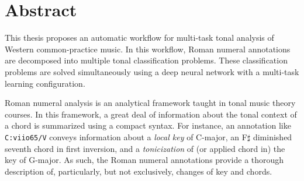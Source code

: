 \chapter*{Abstract}
\label{chap:chap0-abs}

This thesis proposes an automatic workflow for multi-task tonal analysis of Western common-practice music. 
In this workflow, Roman numeral annotations are decomposed into multiple tonal classification problems. 
These classification problems are solved simultaneously using a deep neural network with a multi-task learning configuration.

Roman numeral analysis is an analytical framework taught in tonal music theory courses.
In this framework, a great deal of information about the tonal context of a chord is summarized using a compact syntax. 
For instance, an annotation like  \texttt{C:viio65/V} conveys information about a \emph{local key} of C-major, an F$\sharp$ diminished seventh chord in first inversion, and a \emph{tonicization} of (or applied chord in) the key of G-major.
As such, the Roman numeral annotations provide a thorough description of, particularly, but not exclusively, changes of key and chords.